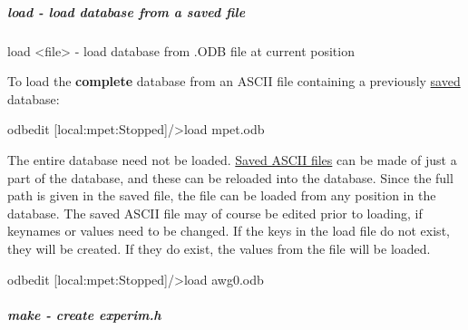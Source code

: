 \hypertarget{RC_odbedit_examples_RC_odbedit_load}{}\subparagraph{load -\/ load database from a saved file}\label{RC_odbedit_examples_RC_odbedit_load}

\begin{DoxyCode}
load <file>             - load database from .ODB file at current position
\end{DoxyCode}
 To load the {\bfseries complete} database from an ASCII file containing a previously \hyperlink{RC_odbedit_examples_RC_odbedit_save}{saved} database: 
\begin{DoxyCode}
 odbedit
[local:mpet:Stopped]/>load mpet.odb
\end{DoxyCode}
 The entire database need not be loaded. \hyperlink{RC_odbedit_examples_RC_odbedit_save}{Saved ASCII files} can be made of just a part of the database, and these can be reloaded into the database. Since the full path is given in the saved file, the file can be loaded from any position in the database. The saved ASCII file may of course be edited prior to loading, if keynames or values need to be changed. If the keys in the load file do not exist, they will be created. If they do exist, the values from the file will be loaded. 
\begin{DoxyCode}
 odbedit
[local:mpet:Stopped]/>load awg0.odb
\end{DoxyCode}
 \par


\label{RC_odbedit_examples_idx_experim-dot-h_make}
\hypertarget{RC_odbedit_examples_idx_experim-dot-h_make}{}
 

\hypertarget{RC_odbedit_examples_RC_odbedit_make}{}\subparagraph{make -\/ create experim.h}\label{RC_odbedit_examples_RC_odbedit_make}

